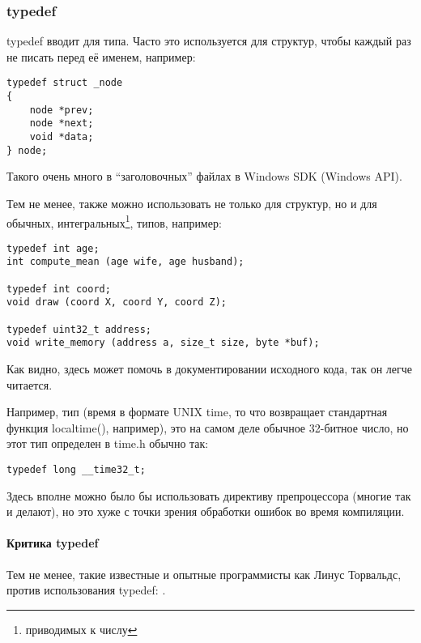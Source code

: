 ﻿\label{typedef}
\subsubsection{typedef}

typedef вводит  для типа. Часто это используется для структур, чтобы каждый раз не писать 
перед её именем, например:

\begin{lstlisting}
typedef struct _node
{
	node *prev;
	node *next;
	void *data;
} node;
\end{lstlisting}

Такого очень много в ``заголовочных'' файлах в Windows SDK (Windows API).

Тем не менее,  также можно использовать не только для структур, но и для обычных, 
интегральных\footnote{приводимых к числу}, типов, например:

\begin{lstlisting}
typedef int age;
int compute_mean (age wife, age husband);

typedef int coord;
void draw (coord X, coord Y, coord Z);

typedef uint32_t address;
void write_memory (address a, size_t size, byte *buf);
\end{lstlisting}

Как видно,  здесь может помочь в документировании исходного кода, так он легче читается.

Например, тип  (время в формате UNIX time, то что возвращает стандартная функция localtime(), 
например), это на самом деле
обычное 32-битное число, но этот тип определен в time.h обычно так:

\begin{lstlisting}
typedef long __time32_t;
\end{lstlisting}

Здесь вполне можно было бы использовать директиву препроцессора  (многие так и делают),
но это хуже с точки зрения обработки ошибок во время компиляции.

\paragraph{Критика typedef}

Тем не менее, такие известные и опытные программисты как Линус Торвальдс, против использования typedef:
\cite{Torvalds:2002}.

